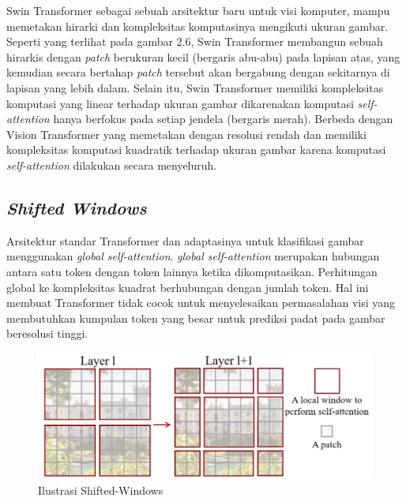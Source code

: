 Swin Transformer sebagai sebuah arsitektur baru untuk visi komputer, mampu \linebreak memetakan hirarki dan kompleksitas komputasinya mengikuti ukuran gambar. Seperti yang 
terlihat pada gambar 2.6, Swin Transformer membangun sebuah hirarkis dengan \emph{patch} berukuran kecil (bergaris abu-abu) pada lapisan atas, yang kemudian secara 
bertahap \emph{patch} tersebut akan bergabung dengan sekitarnya di lapisan yang lebih dalam. Selain itu, Swin Transformer memiliki kompleksitas komputasi yang linear 
terhadap ukuran gambar dikarenakan komputasi \emph{self-attention} hanya berfokus pada setiap jendela (bergaris merah). Berbeda dengan Vision Transformer yang 
memetakan dengan resolusi rendah dan memiliki kompleksitas komputasi kuadratik terhadap ukuran gambar karena komputasi \emph{self-attention} dilakukan secara 
menyeluruh. \parencite{Liu2021}

\subsection{\emph{Shifted Windows}}

Arsitektur standar Transformer dan adaptasinya untuk klasifikasi gambar menggunakan \emph{global self-attention}. \emph{global self-attention} merupakan hubungan antara 
satu token dengan token lainnya ketika dikomputasikan. Perhitungan global ke kompleksitas kuadrat berhubungan dengan jumlah token. Hal ini membuat Transformer tidak cocok 
untuk menyelesaikan permasalahan visi yang membutuhkan kumpulan token yang besar untuk prediksi padat pada gambar beresolusi tinggi. \parencite{Liu2021}

\begin{figure}[ht]
  \centering
  \includegraphics[scale=0.7]{gambar/Ilustrasi Shifted Windows.png}
  \caption{Ilustrasi Shifted-Windows}
  \label{fig:ilustrasishiftedwindows}
\end{figure}

